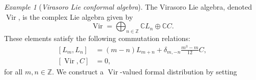 \documentclass[a4paper, 12pt, reqno]{amsart}
\theoremstyle{remark}
\newtheorem{example}[theorem]{Example}
\numberwithin{equation}{subsection}
\DeclareMathOperator{\Vir}{Vir}
\begin{document}
\begin{example}[\emph{Virasoro Lie conformal algebra}]
  \label{exa:1}
  The Virasoro Lie algebra, denoted $\Vir$, is the complex Lie algebra given by
  \begin{equation*}
    \Vir = \bigoplus_{n \in \mathbb{Z}}\mathbb{C}L_{n} \oplus \mathbb{C}C.
  \end{equation*}
  These elements satisfy the following commutation relations:
  \begin{equation}
    \label{eq:8}
    \begin{aligned}
      [L_m, L_n] &= (m - n)L_{m + n} + \delta_{m, -n}\frac{m^3 - m}{12}C, \\
      [\Vir, C] &= 0,
    \end{aligned}
  \end{equation}
  for all $m, n \in \mathbb{Z}$.
  We construct a $\Vir$-valued formal distribution by setting
  

\end{example}
\end{document}
